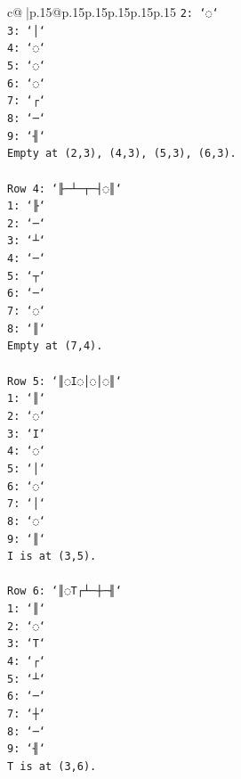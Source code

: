 \documentclass{article}
\begin{document}
{\begin{supertabular}{c@{$\;$}|p{.15\linewidth}@{}p{.15\linewidth}p{.15\linewidth}p{.15\linewidth}p{.15\linewidth}p{.15\linewidth}}
{{{\texttt{2: `◌`} \\
\texttt{3: `│`} \\
\texttt{4: `◌`} \\
\texttt{5: `◌`} \\
\texttt{6: `◌`} \\
\texttt{7: `┌`} \\
\texttt{8: `─`} \\
\texttt{9: `╢`} \\
\texttt{Empty at (2,3), (4,3), (5,3), (6,3).} \\
\\ 
\texttt{Row 4: `╟─┴─┬─┤◌║`} \\
\texttt{1: `╟`} \\
\texttt{2: `─`} \\
\texttt{3: `┴`} \\
\texttt{4: `─`} \\
\texttt{5: `┬`} \\
\texttt{6: `─`} \\
\texttt{7: `◌`} \\
\texttt{8: `║`} \\
\texttt{Empty at (7,4).} \\
\\ 
\texttt{Row 5: `║◌I◌│◌│◌║`} \\
\texttt{1: `║`} \\
\texttt{2: `◌`} \\
\texttt{3: `I`} \\
\texttt{4: `◌`} \\
\texttt{5: `│`} \\
\texttt{6: `◌`} \\
\texttt{7: `│`} \\
\texttt{8: `◌`} \\
\texttt{9: `║`} \\
\texttt{I is at (3,5).} \\
\\ 
\texttt{Row 6: `║◌T┌┴─┼─╢`} \\
\texttt{1: `║`} \\
\texttt{2: `◌`} \\
\texttt{3: `T`} \\
\texttt{4: `┌`} \\
\texttt{5: `┴`} \\
\texttt{6: `─`} \\
\texttt{7: `┼`} \\
\texttt{8: `─`} \\
\texttt{9: `╢`} \\
\texttt{T is at (3,6).} \\
}}}
\end{supertabular}}
\end{document}
